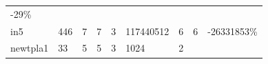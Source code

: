 \documentclass[
]{book}
\begin{document}
\begin{longtable}[]{@{}lllllllll@{}}
\begin{minipage}[t]{0.07\columnwidth}
-29\%\strut
\end{minipage}\tabularnewline
\begin{minipage}[t]{0.07\columnwidth}\raggedright
in5\strut
\end{minipage} & \begin{minipage}[t]{0.11\columnwidth}\raggedright
446\strut
\end{minipage} & \begin{minipage}[t]{0.08\columnwidth}\raggedright
7\strut
\end{minipage} & \begin{minipage}[t]{0.07\columnwidth}\raggedright
7\strut
\end{minipage} & \begin{minipage}[t]{0.09\columnwidth}\raggedright
3\strut
\end{minipage} & \begin{minipage}[t]{0.12\columnwidth}\raggedright
117440512\strut
\end{minipage} & \begin{minipage}[t]{0.08\columnwidth}\raggedright
6\strut
\end{minipage} & \begin{minipage}[t]{0.07\columnwidth}\raggedright
6\strut
\end{minipage} & \begin{minipage}[t]{0.07\columnwidth}\raggedright
-26331853\%\strut
\end{minipage}\tabularnewline
\begin{minipage}[t]{0.07\columnwidth}\raggedright
newtpla1\strut
\end{minipage} & \begin{minipage}[t]{0.11\columnwidth}\raggedright
33\strut
\end{minipage} & \begin{minipage}[t]{0.08\columnwidth}\raggedright
5\strut
\end{minipage} & \begin{minipage}[t]{0.07\columnwidth}\raggedright
5\strut
\end{minipage} & \begin{minipage}[t]{0.09\columnwidth}\raggedright
3\strut
\end{minipage} & \begin{minipage}[t]{0.12\columnwidth}\raggedright
1024\strut
\end{minipage} & \begin{minipage}[t]{0.08\columnwidth}\raggedright
2\strut
\end{minipage} & \begin{minipage}[t]{0.07\columnwidth}\raggedright

\end{minipage}
\end{longtable}
\end{document}
